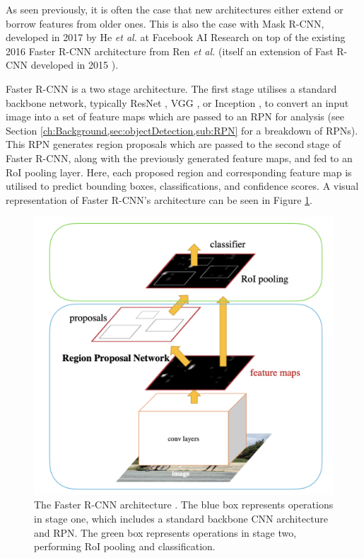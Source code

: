 As seen previously, it is often the case that new architectures either extend or borrow features from older ones. This is also the case with Mask R-CNN, developed in 2017 by He \textit{et al.} at Facebook AI Research on top of the existing 2016 Faster R-CNN architecture from Ren \textit{et al.} \cite{ren_faster_2015} (itself an extension of Fast R-CNN developed in 2015 \cite{girshick_fast_2015}). 

Faster R-CNN is a two stage architecture. The first stage utilises a standard backbone network, typically ResNet \cite{he_deep_2015}, VGG \cite{simonyan_very_2015}, or Inception \cite{szegedy_going_2015}, to convert an input image into a set of feature maps which are passed to an RPN for analysis (see Section \ref{ch:Background,sec:objectDetection,sub:RPN} for a breakdown of RPNs). This RPN generates region proposals which are passed to the second stage of Faster R-CNN, along with the previously generated feature maps, and fed to an RoI pooling layer.  Here, each proposed region and corresponding feature map is utilised to predict bounding boxes, classifications, and confidence scores. A visual representation of Faster R-CNN's architecture can be seen in Figure \ref{fig:faster-r-cnn-architecture}.


\begin{figure}
	\begin{center}
		\includegraphics[scale=0.5]{Chapter2/figs/faster-r-cnn-architecture.png}
	\end{center}
	\caption[The Faster R-CNN architecture.]{The Faster R-CNN architecture \cite{ren_faster_2015}. The blue box represents operations in stage one, which includes a standard backbone CNN architecture and RPN. The green box represents operations in stage two, performing RoI pooling and classification.}
	\label{fig:faster-r-cnn-architecture}
\end{figure}

